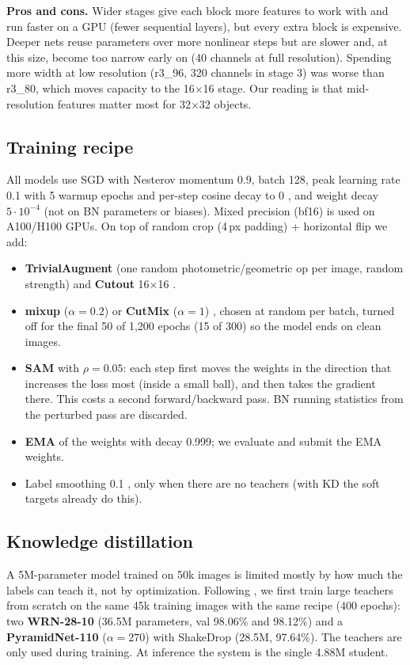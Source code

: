\documentclass[10pt]{article}
\begin{document}
\textbf{Pros and cons.} Wider stages give each block more features to work with and run faster on a
GPU (fewer sequential layers), but every extra block is expensive. Deeper nets reuse parameters over more
nonlinear steps but are slower and, at this size, become too narrow early on (40 channels at full
resolution). Spending more width at low resolution (r3\_96, 320 channels in stage 3) was worse than
r3\_80, which moves capacity to the 16$\times$16 stage. Our reading is that mid-resolution features matter
most for 32$\times$32 objects.

\subsection{Training recipe}
All models use SGD with Nesterov momentum 0.9, batch 128, peak learning rate 0.1 with 5 warmup epochs and
per-step cosine decay to 0 \cite{loshchilov2017sgdr}, and weight decay $5\cdot10^{-4}$ (not on BN parameters or biases). Mixed precision
(bf16) is used on A100/H100 GPUs. On top of random crop (4\,px padding) + horizontal flip we add:
\begin{itemize}
\item \textbf{TrivialAugment} \cite{muller2021trivial} (one random photometric/geometric op per image, random strength) and
  \textbf{Cutout} 16$\times$16 \cite{devries2017cutout}.
\item \textbf{mixup} ($\alpha{=}0.2$) \cite{zhang2018mixup} or \textbf{CutMix} ($\alpha{=}1$) \cite{yun2019cutmix}, chosen at random per batch,
  turned off for the final 50 of 1,200 epochs (15 of 300) so the model ends on clean images.
\item \textbf{SAM} \cite{foret2021sam} with $\rho{=}0.05$: each step first moves the weights in the direction that increases the loss most
  (inside a small ball), and then takes the gradient there. This costs a second forward/backward pass. BN running
  statistics from the perturbed pass are discarded.
\item \textbf{EMA} of the weights with decay 0.999; we evaluate and submit the EMA weights.
\item Label smoothing 0.1 \cite{szegedy2016rethinking}, only when there are no teachers (with KD the soft targets already do this).
\end{itemize}

\subsection{Knowledge distillation}
A 5M-parameter model trained on 50k images is limited mostly by how much the labels can teach it, not by
optimization. Following \cite{hinton2015distilling}, we first train large teachers from scratch on the same 45k training images
with the same recipe (400 epochs): two \textbf{WRN-28-10} \cite{zagoruyko2016wide} (36.5M parameters, val 98.06\% and 98.12\%)
and a \textbf{PyramidNet-110} ($\alpha{=}270$) with ShakeDrop \cite{han2017pyramidal,yamada2019shakedrop} (28.5M, 97.64\%).
The teachers are only used during training. At inference the system is the single 4.88M student.
\end{document}
